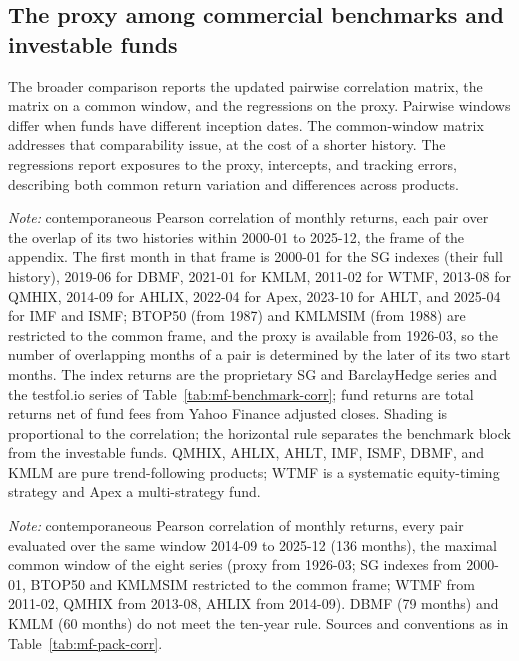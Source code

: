 \subsection{The proxy among commercial benchmarks and investable funds}
\label{app:mf-funds}
The broader comparison reports the updated pairwise correlation matrix,
the matrix on a common window, and the regressions on the proxy.
Pairwise windows differ when funds have different inception dates. The
common-window matrix addresses that comparability issue, at the cost of a
shorter history. The regressions report exposures to the proxy, intercepts, and tracking
errors, describing both common return variation and differences across products.
\begin{table}[H]
\centering
\caption{Correlation matrix of monthly returns: the net proxy, commercial
benchmarks, and investable managed-futures funds}
\label{tab:mf-pack-corr}
\footnotesize

\begin{minipage}{0.86\textwidth}\footnotesize
\textit{Note:} contemporaneous Pearson correlation of monthly returns, each
pair over the overlap of its two histories within 2000-01 to 2025-12, the
frame of the appendix. The first month in that frame is 2000-01 for the SG
indexes (their full history), 2019-06 for DBMF, 2021-01 for KMLM, 2011-02 for
WTMF, 2013-08 for QMHIX, 2014-09 for AHLIX, 2022-04 for Apex, 2023-10 for
AHLT, and 2025-04 for IMF and ISMF; BTOP50 (from 1987) and KMLMSIM (from
1988) are restricted to the common frame, and the proxy is available from
1926-03, so the number of overlapping months of a pair is determined by the
later of its two start months. The index returns are the proprietary SG and
BarclayHedge series and the testfol.io series of
Table~\ref{tab:mf-benchmark-corr}; fund returns are total returns net of fund
fees from Yahoo Finance adjusted closes. Shading is proportional to the
correlation; the horizontal rule separates the benchmark block from the
investable funds. QMHIX, AHLIX, AHLT, IMF, ISMF, DBMF, and KMLM are pure
trend-following products; WTMF is a systematic equity-timing strategy and
Apex a multi-strategy fund.
\end{minipage}
\end{table}

\begin{table}[H]
\centering
\caption{Correlation matrix over a common window: the proxy and the
benchmarks and funds with at least ten years of history}
\label{tab:mf-pack-long-corr}
\footnotesize

\begin{minipage}{0.86\textwidth}\footnotesize
\textit{Note:} contemporaneous Pearson correlation of monthly returns, every
pair evaluated over the same window 2014-09 to 2025-12 (136 months), the
maximal common window of the eight series (proxy from 1926-03; SG indexes
from 2000-01, BTOP50 and KMLMSIM restricted to the common frame; WTMF from
2011-02, QMHIX from 2013-08, AHLIX from 2014-09). DBMF (79 months) and KMLM
(60 months) do not meet the ten-year rule. Sources and conventions as
in Table~\ref{tab:mf-pack-corr}.
\end{minipage}
\end{table}

